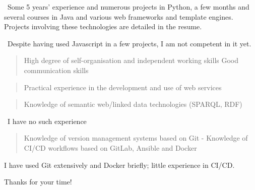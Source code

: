 \documentclass[fleqn,10pt]{article}
\begin{document}
{\begin{minipage}{0.8\textwidth}
\cmark\ Some 5 years' experience and numerous projects in Python, a few months and several courses in Java and various web frameworks and template engines. Projects involving these technologies are detailed in the resume.

\ntilde\ Despite having used Javascript in a few projects, I am not competent in it yet.

\begin{quote}
High degree of self-organisation and independent working skills
Good communication skills

\end{quote}

\begin{quote}
Practical experience in the development and use of web services
\end{quote}

\begin{quote}
Knowledge of semantic web/linked data technologies (SPARQL, RDF)
\end{quote}
\xmark\ I have no such experience
\begin{quote}
Knowledge of version management systems based on Git - Knowledge of CI/CD workflows based on GitLab, Ansible and Docker
\end{quote}
\cmark I have used Git extensively and Docker briefly; little experience in CI/CD. 

Thanks for your time!

\end{minipage}}



\restoregeometry


\clearpage
\end{document}
